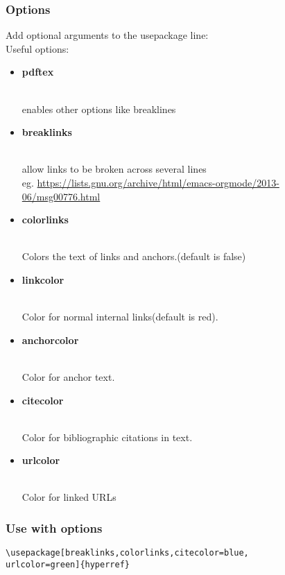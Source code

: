 \subsubsection[Options]{\Large Options}
Add optional arguments to the usepackage line:\\
Useful options:\begin{itemize}
\item \begin{large}\textbf{pdftex}\end{large}\\enables other options like breaklines
\item \begin{large}\textbf{breaklinks}\end{large}\\allow links to be broken across several lines\\eg. \url{https://lists.gnu.org/archive/html/emacs-orgmode/2013-06/msg00776.html}
\item \begin{large}\textbf{colorlinks}\end{large}\\Colors the text of links and anchors.(default is false)
\item \begin{large}\textbf{linkcolor}\end{large}\\Color for normal internal links(default is red).
\item \begin{large}\textbf{anchorcolor}\end{large}\\Color for anchor text.
\item \begin{large}\textbf{citecolor}\end{large}\\Color for bibliographic citations in text.
\item \begin{large}\textbf{urlcolor}\end{large}\\Color for linked URLs

\end{itemize}

\subsubsection[Use with Options]{\Large Use with options}
\begin{verbatim}
\usepackage[breaklinks,colorlinks,citecolor=blue,
urlcolor=green]{hyperref}
\end{verbatim}

